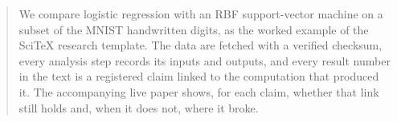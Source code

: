 \begin{abstract}

We compare logistic regression with an RBF support-vector machine on a
subset of the MNIST handwritten digits, as the worked example of the SciTeX
research template. The data are fetched with a verified checksum, every
analysis step records its inputs and outputs, and every result number in
the text is a registered claim linked to the computation that produced it.
The accompanying live paper shows, for each claim, whether that link still
holds and, when it does not, where it broke.

\vspace{1em}
\end{abstract}

